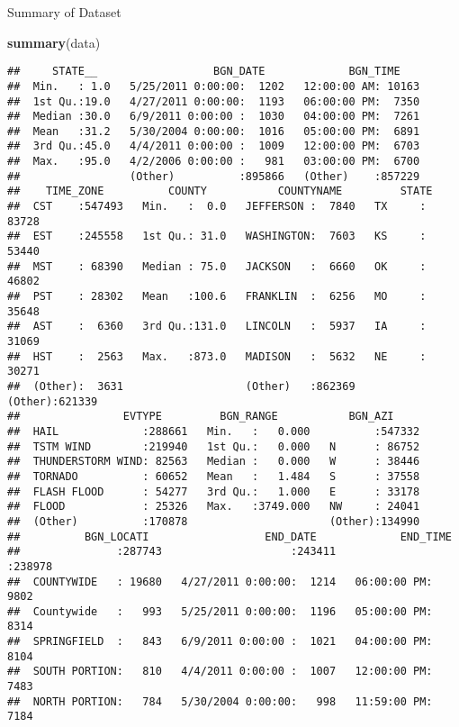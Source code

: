 \documentclass[
]{article}
\newenvironment{Shaded}{\begin{snugshade}}{\end{snugshade}}
\newcommand{\KeywordTok}[1]{\textcolor[rgb]{0.13,0.29,0.53}{\textbf{#1}}}
\newcommand{\NormalTok}[1]{#1}
\begin{document}
Summary of Dataset

\begin{Shaded}
\begin{Highlighting}[]
\KeywordTok{summary}\NormalTok{(data)}
\end{Highlighting}
\end{Shaded}

\begin{verbatim}
##     STATE__                  BGN_DATE             BGN_TIME     
##  Min.   : 1.0   5/25/2011 0:00:00:  1202   12:00:00 AM: 10163  
##  1st Qu.:19.0   4/27/2011 0:00:00:  1193   06:00:00 PM:  7350  
##  Median :30.0   6/9/2011 0:00:00 :  1030   04:00:00 PM:  7261  
##  Mean   :31.2   5/30/2004 0:00:00:  1016   05:00:00 PM:  6891  
##  3rd Qu.:45.0   4/4/2011 0:00:00 :  1009   12:00:00 PM:  6703  
##  Max.   :95.0   4/2/2006 0:00:00 :   981   03:00:00 PM:  6700  
##                 (Other)          :895866   (Other)    :857229  
##    TIME_ZONE          COUNTY           COUNTYNAME         STATE       
##  CST    :547493   Min.   :  0.0   JEFFERSON :  7840   TX     : 83728  
##  EST    :245558   1st Qu.: 31.0   WASHINGTON:  7603   KS     : 53440  
##  MST    : 68390   Median : 75.0   JACKSON   :  6660   OK     : 46802  
##  PST    : 28302   Mean   :100.6   FRANKLIN  :  6256   MO     : 35648  
##  AST    :  6360   3rd Qu.:131.0   LINCOLN   :  5937   IA     : 31069  
##  HST    :  2563   Max.   :873.0   MADISON   :  5632   NE     : 30271  
##  (Other):  3631                   (Other)   :862369   (Other):621339  
##                EVTYPE         BGN_RANGE           BGN_AZI      
##  HAIL             :288661   Min.   :   0.000          :547332  
##  TSTM WIND        :219940   1st Qu.:   0.000   N      : 86752  
##  THUNDERSTORM WIND: 82563   Median :   0.000   W      : 38446  
##  TORNADO          : 60652   Mean   :   1.484   S      : 37558  
##  FLASH FLOOD      : 54277   3rd Qu.:   1.000   E      : 33178  
##  FLOOD            : 25326   Max.   :3749.000   NW     : 24041  
##  (Other)          :170878                      (Other):134990  
##          BGN_LOCATI                  END_DATE             END_TIME     
##               :287743                    :243411              :238978  
##  COUNTYWIDE   : 19680   4/27/2011 0:00:00:  1214   06:00:00 PM:  9802  
##  Countywide   :   993   5/25/2011 0:00:00:  1196   05:00:00 PM:  8314  
##  SPRINGFIELD  :   843   6/9/2011 0:00:00 :  1021   04:00:00 PM:  8104  
##  SOUTH PORTION:   810   4/4/2011 0:00:00 :  1007   12:00:00 PM:  7483  
##  NORTH PORTION:   784   5/30/2004 0:00:00:   998   11:59:00 PM:  7184  

\end{verbatim}
\end{document}
